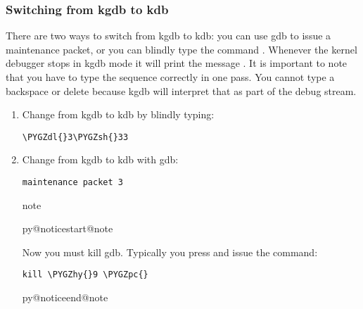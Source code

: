 \documentclass[a4paper,8pt,english]{sphinxmanual}
\makeatletter
\renewenvironment{notice}[2]{%
          \def\py@noticetype{#1}
          \begin{coloredbox}{#1}
          \bf\it
          \par\strong{#2}
          \csname py@noticestart@#1\endcsname
        }
	{
          \csname py@noticeend@\py@noticetype\endcsname
          \end{coloredbox}
        }
\def\PYGZsh{\char`\#}
\def\PYGZpc{\char`\%}
\def\PYGZdl{\char`\$}
\def\PYGZhy{\char`\-}
\makeatother
\begin{document}
\subsubsection{Switching from kgdb to kdb}
\label{dev-tools/kgdb:switching-from-kgdb-to-kdb}
There are two ways to switch from kgdb to kdb: you can use gdb to issue
a maintenance packet, or you can blindly type the command .
Whenever the kernel debugger stops in kgdb mode it will print the
message . It is important to note that you have
to type the sequence correctly in one pass. You cannot type a backspace
or delete because kgdb will interpret that as part of the debug stream.
\begin{enumerate}
\item {} 
Change from kgdb to kdb by blindly typing:

\begin{Verbatim}[commandchars=\\\{\}]
\PYGZdl{}3\PYGZsh{}33
\end{Verbatim}

\item {} 
Change from kgdb to kdb with gdb:

\begin{Verbatim}[commandchars=\\\{\}]
maintenance packet 3
\end{Verbatim}

\begin{notice}{note}{Note:}
Now you must kill gdb. Typically you press  and issue
the command:

\begin{Verbatim}[commandchars=\\\{\}]
kill \PYGZhy{}9 \PYGZpc{}
\end{Verbatim}
\end{notice}

\end{enumerate}
\end{document}

